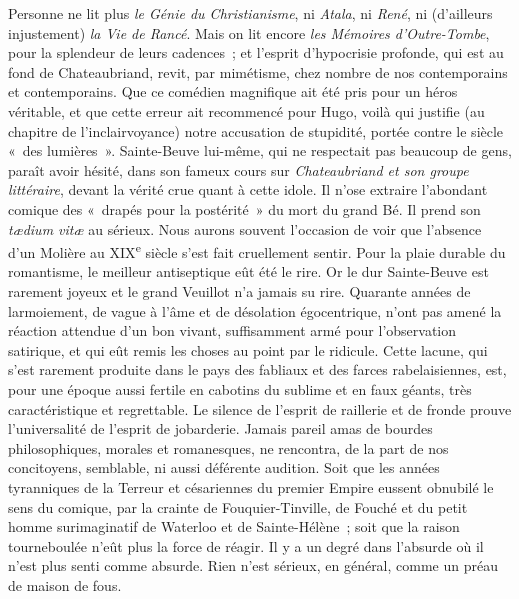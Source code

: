\documentclass[french,twoside]{book} %
\begin{document}
Personne ne lit plus {\itshape le Génie du Christianisme}, ni {\itshape Atala}, ni {\itshape René}, ni (d’ailleurs injustement) {\itshape la Vie de Rancé}. Mais on lit encore {\itshape les Mémoires d’Outre-Tombe}, pour la splendeur de leurs cadences ; et l’esprit d’hypocrisie profonde, qui est au fond de Chateaubriand, revit, par mimétisme, chez nombre de nos contemporains et contemporains. Que ce comédien magnifique ait été pris pour un héros véritable, et que cette erreur ait recommencé pour Hugo, voilà qui justifie (au chapitre de l’inclairvoyance) notre accusation de stupidité, portée contre le siècle « des lumières ». Sainte-Beuve lui-même, qui ne respectait pas beaucoup de gens, paraît avoir hésité, dans son fameux cours sur {\itshape Chateaubriand et son groupe littéraire}, devant la vérité crue quant à cette idole. Il n’ose extraire l’abondant comique des « drapés pour la postérité » du mort du grand Bé. Il prend son {\itshape tædium vitæ} au sérieux. Nous aurons souvent l’occasion de voir que l’absence d’un Molière au XIX\textsuperscript{e} siècle s’est fait cruellement sentir. Pour la plaie durable du romantisme, le meilleur antiseptique eût été le rire. Or le dur Sainte-Beuve est rarement joyeux et le grand Veuillot n’a jamais su rire. Quarante années de larmoiement, de vague à l’âme et de désolation égocentrique, n’ont pas amené la réaction attendue d’un bon vivant, suffisamment armé pour l’observation satirique, et qui eût remis les choses au point par le ridicule. Cette lacune, qui s’est rarement produite dans le pays des fabliaux et des farces rabelaisiennes, est, pour une époque aussi fertile en cabotins du sublime et en faux géants, très caractéristique et regrettable. Le silence de l’esprit de raillerie et de fronde prouve l’universalité de l’esprit de jobarderie. Jamais pareil amas de bourdes philosophiques, morales et romanesques, ne rencontra, de la part de nos concitoyens, semblable, ni aussi déférente audition. Soit que les années tyranniques de la Terreur et césariennes du premier Empire eussent obnubilé le sens du comique, par la crainte de Fouquier-Tinville, de Fouché et du petit homme surimaginatif de Waterloo et de Sainte-Hélène ; soit que la raison tourneboulée n’eût plus la force de réagir. Il y a un degré dans l’absurde où il n’est plus senti comme absurde. Rien n’est sérieux, en général, comme un préau de maison de fous.\par
\end{document}
